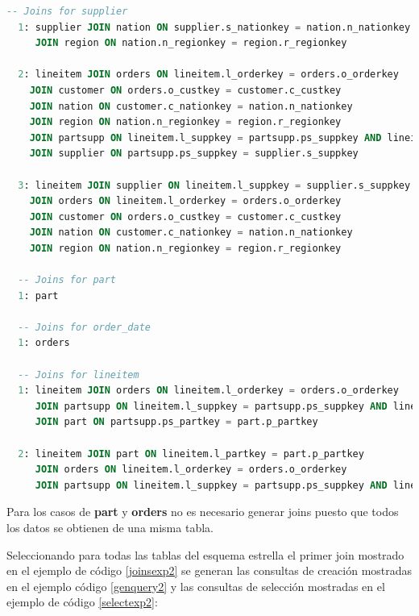 \begin{lstlisting}[label={joinsexp2}, caption={Joins computados para el experimento 2}, language={sql}]
  -- Joins for supplier
  1: supplier JOIN nation ON supplier.s_nationkey = nation.n_nationkey 
     JOIN region ON nation.n_regionkey = region.r_regionkey

  2: lineitem JOIN orders ON lineitem.l_orderkey = orders.o_orderkey 
    JOIN customer ON orders.o_custkey = customer.c_custkey 
    JOIN nation ON customer.c_nationkey = nation.n_nationkey 
    JOIN region ON nation.n_regionkey = region.r_regionkey 
    JOIN partsupp ON lineitem.l_suppkey = partsupp.ps_suppkey AND lineitem.l_partkey = partsupp.ps_partkey 
    JOIN supplier ON partsupp.ps_suppkey = supplier.s_suppkey

  3: lineitem JOIN supplier ON lineitem.l_suppkey = supplier.s_suppkey 
    JOIN orders ON lineitem.l_orderkey = orders.o_orderkey 
    JOIN customer ON orders.o_custkey = customer.c_custkey 
    JOIN nation ON customer.c_nationkey = nation.n_nationkey 
    JOIN region ON nation.n_regionkey = region.r_regionkey

  -- Joins for part
  1: part

  -- Joins for order_date
  1: orders

  -- Joins for lineitem
  1: lineitem JOIN orders ON lineitem.l_orderkey = orders.o_orderkey 
     JOIN partsupp ON lineitem.l_suppkey = partsupp.ps_suppkey AND lineitem.l_partkey = partsupp.ps_partkey 
     JOIN part ON partsupp.ps_partkey = part.p_partkey

  2: lineitem JOIN part ON lineitem.l_partkey = part.p_partkey 
     JOIN orders ON lineitem.l_orderkey = orders.o_orderkey 
     JOIN partsupp ON lineitem.l_suppkey = partsupp.ps_suppkey AND lineitem.l_partkey = partsupp.ps_partkey
\end{lstlisting}

Para los casos de \textbf{part} y \textbf{orders} no es necesario generar joins puesto que todos los datos se obtienen de 
una misma tabla. 

Seleccionando para todas las tablas del esquema estrella el primer join mostrado en el ejemplo de c\'odigo \ref{joinsexp2} se generan 
las consultas de creaci\'on mostradas en el ejemplo c\'odigo \ref{genquery2} y las consultas de selecci\'on 
mostradas en el ejemplo de c\'odigo \ref{selectexp2}: 

